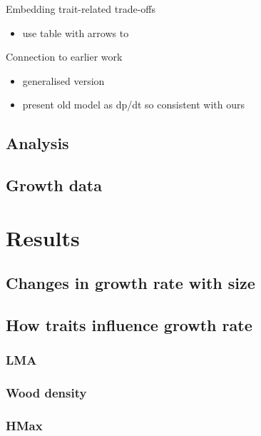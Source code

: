 \documentclass[12pt, a4paper]{article}
\begin{document}
Embedding trait-related trade-offs

\begin{itemize}
\itemsep1pt\parskip0pt
\item
  use table with arrows to
\end{itemize}

Connection to earlier work

\begin{itemize}
\itemsep1pt\parskip0pt
\item
  generalised version
\item
  present old model as dp/dt so consistent with ours
\end{itemize}

\subsection*{Analysis}\label{analysis}

\subsection*{Growth data}\label{growth-data}

\section*{Results}\label{results}

\subsection*{Changes in growth rate with
size}\label{changes-in-growth-rate-with-size}

\subsection*{How traits influence growth
rate}\label{how-traits-influence-growth-rate}

\subsubsection*{LMA}\label{lma}

\subsubsection*{Wood density}\label{wood-density}

\subsubsection*{HMax}\label{hmax}
\end{document}
